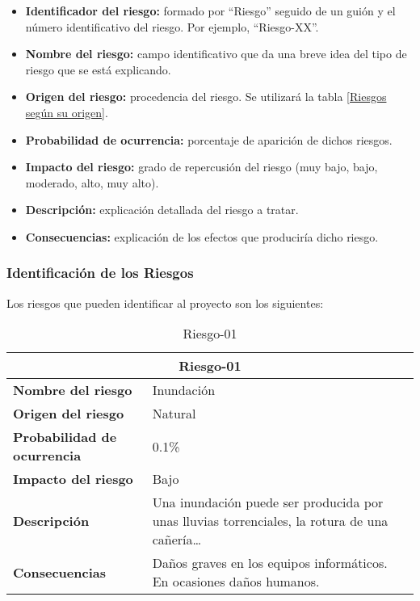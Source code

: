 \begin{itemize}[-]
  \item \textbf{Identificador del riesgo:} formado por “Riesgo” seguido de un guión y el número identificativo del riesgo. Por ejemplo, “Riesgo-XX”.
  \item \textbf{Nombre del riesgo:} campo identificativo que da una breve idea del tipo de riesgo que se está explicando.
  \item \textbf{Origen del riesgo:} procedencia del riesgo. Se utilizará la tabla [\hyperref[origenRiesgos]{Riesgos según su origen}].
  \item \textbf{Probabilidad de ocurrencia:} porcentaje de aparición de dichos riesgos.
  \item \textbf{Impacto del riesgo:} grado de repercusión del riesgo (muy bajo, bajo, moderado, alto, muy alto).
  \item \textbf{Descripción:} explicación detallada del riesgo a tratar.
  \item \textbf{Consecuencias:} explicación de los efectos que produciría dicho riesgo.
\end{itemize}

\subsubsection{Identificación de los Riesgos}
\par Los riesgos que pueden identificar al proyecto son los siguientes:

\begin{table}[H]
\begin{center}
\begin{tabular}{p{} p{7cm}}
\multicolumn{2}{c}{\textbf{Riesgo-01} } \\
\hline \hline
\textbf{Nombre del riesgo} & Inundación \\
\hline
\textbf{Origen del riesgo} & Natural \\
\hline
\textbf{Probabilidad de ocurrencia} & 0.1\%  \\
\hline
\textbf{Impacto del riesgo} &  Bajo \\
\hline
\textbf{Descripción} &  Una inundación puede ser producida por unas lluvias torrenciales, la rotura de una cañería… \\
\hline
\textbf{Consecuencias} &  Daños  graves  en los equipos informáticos. En ocasiones daños humanos. \\
\hline
\end{tabular}
\caption{Riesgo-01}
\label{tab:Riesgo-01}
\end{center}
\end{table}

